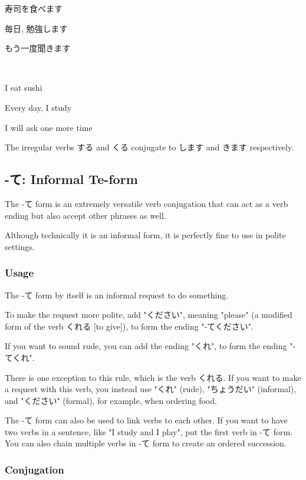 \documentclass{article}
\begin{document}
\begin{CJK}{UTF8}{min}
\begin{example}
寿司を食べます

毎日, 勉強します

もう一度聞きます
\end{example}

\begin{solution}
\ 

I eat sushi

Every day, I study

I will ask one more time
\end{solution}

The irregular verbs する and くる conjugate to します and きます respectively.

\subsection{-て: Informal Te-form}

The -て form is an extremely versatile verb conjugation that can act as a verb ending but also accept other phrases as well.

Although technically it is an informal form, it is perfectly fine to use in polite settings. 

\subsubsection{Usage}

The -て form by itself is an informal request to do something.

To make the request more polite, add "ください", meaning "please" (a modified form of the verb くれる [to give]), to form the ending "-てください". 

If you want to sound rude, you can add the ending "くれ", to form the ending "-てくれ". 

There is one exception to this rule, which is the verb くれる. If you want to make a request with this verb, you instead use "くれ" (rude), "ちょうだい" (informal), and "ください" (formal), for example, when ordering food. 

The -て form can also be used to link verbs to each other. If you want to have two verbs in a sentence, like "I study and I play", put the first verb in -て form. You can also chain multiple verbs in -て form to create an ordered succession. 

\subsubsection{Conjugation}


\end{CJK}
\end{document}

